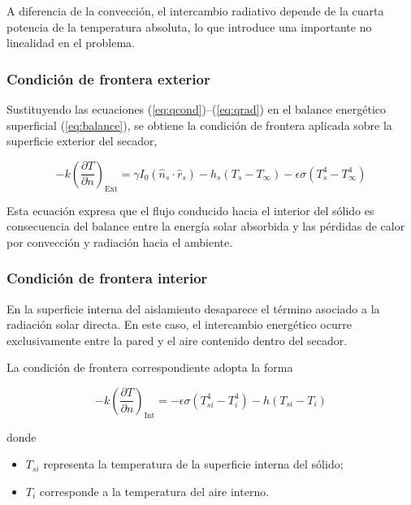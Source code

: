 A diferencia de la convección, el intercambio radiativo depende de la cuarta potencia de la temperatura absoluta, lo que introduce una importante no linealidad en el problema.

\subsubsection{Condición de frontera exterior}

Sustituyendo las ecuaciones
(\ref{eq:qcond})--(\ref{eq:qrad})
en el balance energético superficial
(\ref{eq:balance}),
se obtiene la condición de frontera aplicada sobre la superficie exterior del secador,

\begin{equation}
\boxed{
-k
\left(
\frac{\partial T}{\partial n}
\right)_{\mathrm{Ext}}
=
\gamma I_0
(\hat n_s\cdot\hat r_s)
-
h_s(T_s-T_\infty)
-
\epsilon\sigma
(T_s^4-T_\infty^4)
}
\label{eqn:neumannexterno}
\end{equation}

Esta ecuación expresa que el flujo conducido hacia el interior del sólido es consecuencia del balance entre la energía solar absorbida y las pérdidas de calor por convección y radiación hacia el ambiente.

\subsubsection{Condición de frontera interior}

En la superficie interna del aislamiento desaparece el término asociado a la radiación solar directa. En este caso, el intercambio energético ocurre exclusivamente entre la pared y el aire contenido dentro del secador.

La condición de frontera correspondiente adopta la forma

\begin{equation}
\boxed{
-k
\left(
\frac{\partial T}{\partial n}
\right)_{\mathrm{Int}}
=
-
\epsilon\sigma
(T_{si}^4-T_i^4)
-
h(T_{si}-T_i)
}
\label{eqn:neumanninterno}
\end{equation}

donde

\begin{itemize}

\item $T_{si}$ representa la temperatura de la superficie interna del sólido;

\item $T_i$ corresponde a la temperatura del aire interno.

\end{itemize}


